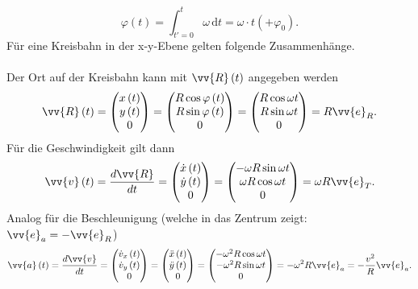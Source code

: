 \documentclass[a4paper,12pt]{article}
\newcommand{\td}{\,\text{d}}
\begin{document}
\[ 
        \varphi \left(t\right)=\int_{t'=0}^{t}\omega \td t=\omega \cdot t\left(+\varphi _0\right)
.\] 
Für eine Kreisbahn in der x-y-Ebene gelten folgende Zusammenhänge.\\\\
Der Ort auf der Kreisbahn kann mit $\vv{R}\left(t\right)$ angegeben werden
\[ 
        \vv{R}\left(t\right)=\left(\begin{matrix}
                x\left(t\right)\\y\left(t\right)\\0
        \end{matrix}\right)=\left(\begin{matrix}
                R\cos \varphi \left(t\right)\\R\sin \varphi \left(t\right)\\0
        \end{matrix}\right)=\left(\begin{matrix}
                R\cos \omega t\\R\sin \omega t\\0
        \end{matrix}\right)=R\vv{e}_R
.\] 
Für die Geschwindigkeit gilt dann
\[ 
        \vv{v}\left(t\right)=\dfrac{d\vv{R}}{dt}=\left(\begin{matrix}
                \dot{x}\left(t\right)\\\dot{y}\left(t\right)\\0
        \end{matrix}\right)=\left(\begin{matrix}
                -\omega R\sin \omega t\\\omega R\cos \omega t\\0
        \end{matrix}\right)=\omega R\vv{e}_T
.\] 
Analog für die Beschleunigung (welche in das Zentrum zeigt: $\vv{e}_a=-\vv{e}_R$)
\[ 
        \vv{a}\left(t\right)=\dfrac{d\vv{v}}{dt}=\left(\begin{matrix}
                \dot{v}_x\left(t\right)\\\dot{v}_y\left(t\right)\\0
        \end{matrix}\right)=\left(\begin{matrix}
                \ddot{x}\left(t\right)\\\ddot{y}\left(t\right)\\0
        \end{matrix}\right)=\left(\begin{matrix}
                -\omega ^2R\cos \omega t\\-\omega ^2R\sin \omega t\\0
        \end{matrix}\right)=-\omega ^2R\vv{e}_a=-\dfrac{v^2}{R}\vv{e}_a
.\] 
\end{document}

